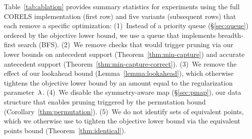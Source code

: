 Table~\ref{tab:ablation} provides summary statistics for experiments using the full
CORELS implementation (first row) and five variants (subsequent rows) that each remove a specific optimization:
%
(1)~Instead of a priority queue (\S\ref{sec:queue}) ordered by the objective lower bound,
we use a queue that implements breadth-first search (BFS).
%
(2)~We remove checks that would trigger pruning via
our lower bounds on antecedent support (Theorem~\ref{thm:min-capture})
and accurate antecedent support (Theorem~\ref{thm:min-capture-correct}).
%
(3)~We remove the effect of our lookahead bound (Lemma~\ref{lemma:lookahead}),
which otherwise tightens the objective lower bound by an amount equal to the regularization parameter~${\lambda}$.
%
(4)~We disable the symmetry-aware map (\S\ref{sec:pmap}), our data structure
that enables pruning triggered by the permutation bound (Corollary~\ref{thm:permutation}).
%
(5)~We do not identify sets of equivalent points, which we otherwise use to tighten the
objective lower bound via the equivalent points bound (Theorem~\ref{thm:identical}).

